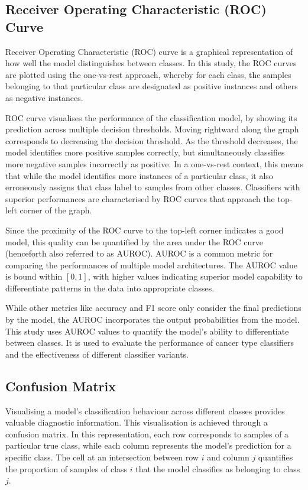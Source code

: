 \documentclass{l4proj}
\begin{document}
\subsection{Receiver Operating Characteristic (ROC) Curve}
Receiver Operating Characteristic (ROC) curve is a graphical representation of how well the model distinguishes between classes. In this study, the ROC curves are plotted using the one-vs-rest approach, whereby for each class, the samples belonging to that particular class are designated as positive instances and others as negative instances.

ROC curve visualises the performance of the classification model, by showing its prediction across multiple decision thresholds. Moving rightward along the graph corresponds to decreasing the decision threshold. As the threshold decreases, the model identifies more positive samples correctly, but simultaneously classifies more negative samples incorrectly as positive. In a one-vs-rest context, this means that while the model identifies more instances of a particular class, it also erroneously assigns that class label to samples from other classes. Classifiers with superior performances are characterised by ROC curves that approach the top-left corner of the graph.

Since the proximity of the ROC curve to the top-left corner indicates a good model, this quality can be quantified by the area under the ROC curve (henceforth also referred to as AUROC). AUROC is a common metric for comparing the performances of multiple model architectures. The AUROC value is bound within $[0, 1]$, with higher values indicating superior model capability to differentiate patterns in the data into appropriate classes.

While other metrics like accuracy and F1 score only consider the final predictions by the model, the AUROC incorporates the output probabilities from the model. This study uses AUROC values to quantify the model's ability to differentiate between classes. It is used to evaluate the performance of cancer type classifiers and the effectiveness of different classifier variants.

\subsection{Confusion Matrix}
Visualising a model's classification behaviour across different classes provides valuable diagnostic information. This visualisation is achieved through a confusion matrix. In this representation, each row corresponds to samples of a particular true class, while each column represents the model's prediction for a specific class. The cell at an intersection between row $i$ and column $j$ quantifies the proportion of samples of class $i$ that the model classifies as belonging to class $j$.
\end{document}
